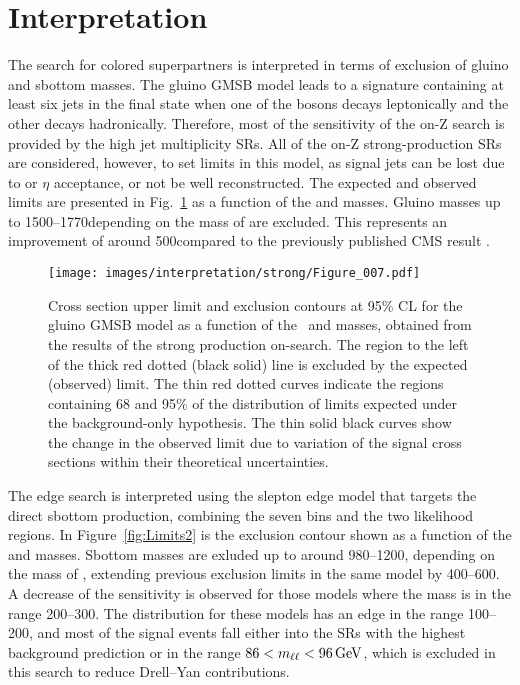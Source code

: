 \section{Interpretation}
\noindent
\justify
The search for colored superpartners is interpreted in terms of exclusion of gluino and sbottom masses. 
The gluino GMSB model leads to a signature containing at least six jets in the final state when one of the \PZ bosons decays leptonically and the other decays hadronically.  
Therefore, most of the sensitivity of the on-Z search is provided by the high jet multiplicity SRs.
All of the on-Z strong-production SRs are considered, however, to set limits in this model, as signal jets can be lost due to \pt or $\eta$ acceptance, or not be well reconstructed.
The expected and observed limits are presented in Fig.~\ref{fig:Limits1} as a function of the \gluino  and \firstchi masses.
Gluino masses up to 1500--1770\GeV depending on the mass of \firstchi are excluded.
This represents an improvement of around 500\GeV compared to the previously published CMS result \cite{Khachatryan:2015lwa}.
\begin{figure}[!hb]
 \centering
   \texttt{[image: images/interpretation/strong/Figure\_007.pdf]}
   \caption{\label{fig:Limits1}
     Cross section upper limit and exclusion contours at 95\% CL for the gluino GMSB model as a function of the \gluino~and \firstchi masses,
     obtained from the results of the strong production on-\PZ search.
     The region to the left of the thick red dotted (black solid) line is excluded by the expected (observed) limit.
     The thin red dotted curves indicate the regions containing 68 and 95\% of the distribution of limits
     expected under the background-only hypothesis.
     The thin solid black curves show the change in the observed limit due to
     variation of the signal cross sections within their theoretical uncertainties.
   }
\end{figure}
\newpara
\noindent\justify
The edge search is interpreted using the slepton edge model that targets the direct sbottom production, combining the seven \mll bins and the two \ttbar likelihood regions.
In Figure~\ref{fig:Limits2} is the exclusion contour shown as a function of the \sbottom and \secondchi masses. 
Sbottom masses are exluded up to around 980--1200\GeV, depending on the mass of \secondchi, extending previous exclusion limits in the same model by 400--600\GeV.
A decrease of the sensitivity is observed for those models where the \secondchi mass is in the range 200--300\GeV.
The \mll distribution for these models has an edge in the range 100--200\GeV, and most of the signal events fall either into the SRs with the highest background prediction or in the range $86 < m_{\ell\ell} < 96\,\text{Ge\hspace{-.08em}V}$, which is excluded in this search to reduce Drell--Yan contributions.

